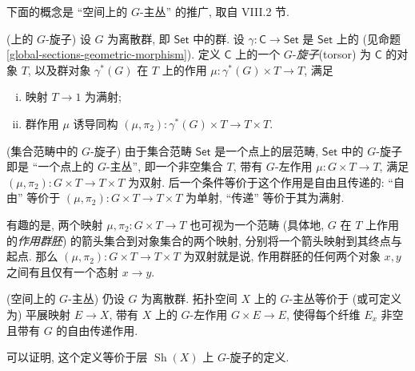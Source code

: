 下面的概念是 ``空间上的 $G$-主丛'' 的推广, 取自 \cite{SGL} VIII.2 节.
\begin{definition}
	[label={G-torsors-over-topos}]
	{(\topos{}上的 $G$-旋子)}
	设 $G$ 为离散群, 即 $\mathsf {Set}$ 中的群.
	设 $\gamma\colon \mathsf C\to \mathsf {Set}$ 是 $\mathsf {Set}$ 上的\topos{} (见命题 \ref{global-sections-geometric-morphism}). 定义 $\mathsf C$ 上的一个 $G$-\emph{旋子}\footnotemark (torsor) 为 $\mathsf C$ 的对象 $T$, 以及群对象 $\gamma^*(G)$ 在 $T$ 上的作用 $\mu\colon \gamma^*(G)\times T \to T$, 满足
	\begin{enumerate}[(i)]
		\item 映射 $T\to 1$ 为满射;
		\item 群作用 $\mu$ 诱导同构 $(\mu,\pi_2)\colon \gamma^*(G)\times T \to T\times T$.
	\end{enumerate}
\end{definition}

%	

\begin{example}
	{(集合范畴中的 $G$-旋子)}
	由于集合范畴 $\mathsf {Set}$ 是一个点上的层范畴,
	$\mathsf {Set}$ 中的 $G$-旋子即是 ``一个点上的 $G$-主丛'',
	即一个非空集合 $T$, 带有 $G$-左作用 $\mu\colon G\times T \to T$, 满足 $(\mu,\pi_2)\colon G\times T \to T\times T$ 为双射.
	后一个条件等价于这个作用是自由且传递的:
	``自由'' 等价于 $(\mu,\pi_2)\colon G\times T \to T\times T$ 为单射, ``传递'' 等价于其为满射.
	
	有趣的是, 两个映射 $\mu,\pi_2\colon G\times T \to T$ 也可视为一个范畴 (具体地, $G$ 在 $T$ 上作用的\emph{作用群胚}) 的箭头集合到对象集合的两个映射, 分别将一个箭头映射到其终点与起点. 那么 $(\mu,\pi_2)\colon G\times T \to T\times T$ 为双射就是说, 作用群胚的任何两个对象 $x,y$ 之间有且仅有一个态射 $x\to y$.
\end{example}

\begin{example}
	{(空间上的 $G$-主丛)}
	仍设 $G$ 为离散群. 拓扑空间 $X$ 上的 $G$-主丛等价于 (或可定义为) 平展映射 $E \to X$, 带有 $X$ 上的 $G$-左作用 $G\times E \to E$, 使得每个纤维 $E_x$ 非空且带有 $G$ 的自由传递作用.
	
	可以证明, 这个定义等价于层\topos{} $\operatorname{Sh}(X)$ 上 $G$-旋子的定义.
\end{example}

